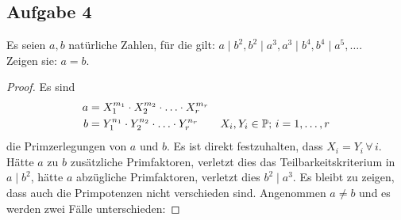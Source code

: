 \subsection{Aufgabe 4}
Es seien $a, b$ natürliche Zahlen, für die gilt:
$a \mid b^2, b^2 \mid a^3, a^3 \mid b^4, b^4 \mid a^5, \dots$.\\
Zeigen sie: $a = b$.
\begin{proof}
  Es sind
  \begin{align*}
    a & = X_1^{m_1} \cdot X_2^{m_2} \cdot \ldots \cdot X_r^{m_r}                                             \\
    b & = Y_1^{n_1} \cdot Y_2^{n_2} \cdot \ldots \cdot Y_r^{n_r} \qquad X_i,Y_i \in \mathbb{P}{};\,i = 1,\dotsc,r
  \end{align*}
  die Primzerlegungen von $a$ und $b$. Es ist direkt festzuhalten, dass $X_i = Y_i\,\forall\,i$.
  Hätte $a$ zu $b$ zusätzliche Primfaktoren, verletzt dies das Teilbarkeitskriterium in $a \mid b^2$,
  hätte $a$ abzügliche Primfaktoren, verletzt dies $b^2 \mid a^3$.
  Es bleibt zu zeigen, dass auch die Primpotenzen nicht verschieden sind.
  Angenommen $a \neq b$ und es werden zwei Fälle unterschieden:


\end{proof}
